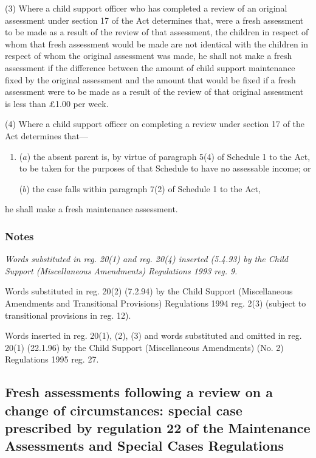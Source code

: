 \documentclass[a4paper]{article}
\newcommand\amendment[1]{\subsubsection*{Notes}{\itshape\frenchspacing\footnotesize #1 \par}}
\begin{document}
(3) Where a child support officer who has completed a review 
of an original assessment  %
under section 17 of the Act determines that, were a fresh assessment to be made as a result of the review
of that assessment, %
the children in respect of whom that 
fresh  %
assessment would be made are not identical with the children in respect of whom the original assessment was made, he shall not make a fresh assessment if the difference between the amount of child support maintenance fixed by the original assessment and the amount that would be fixed if a fresh assessment were to be made as a result of the review 
of that original assessment  %
is less than £1.00 per week.

(4) Where a child support officer on completing a review under section 17 of the Act determines that---
\begin{enumerate}\item[]
($a$) the absent parent is, by virtue of paragraph 5(4) of Schedule 1 to the Act, to be taken for the purposes of that Schedule to have no assessable income; or

($b$) the case falls within paragraph 7(2) of Schedule 1 to the Act,
\end{enumerate}
he shall make a fresh maintenance assessment.

\amendment{
Words substituted in reg. 20(1) and reg. 20(4) inserted (5.4.93) by the Child Support (Miscellaneous Amendments) Regulations 1993 reg. 9.

Words substituted in reg. 20(2) (7.2.94) by the Child Support (Miscellaneous Amendments and Transitional Provisions) Regulations 1994 reg. 2(3) (subject to transitional provisions in reg. 12).

Words inserted in reg. 20(1), (2), (3) and words substituted and omitted in reg. 20(1) (22.1.96) by the Child Support (Miscellaneous Amendments) (No. 2) Regulations 1995 reg. 27. 
}

\subsection[21. Fresh assessments following a review on a change of circumstances: special case prescribed by regulation 22 of the Maintenance Assessments and Special Cases Regulations]{Fresh assessments following a review on a change of circumstances: special case prescribed by regulation 22 of the Maintenance Assessments and Special Cases Regulations}
\end{document}
